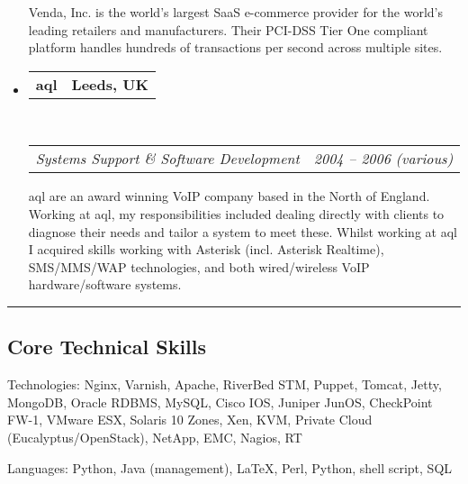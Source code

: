 \documentclass[10pt,a4paper]{article}
\makeatletter
\newenvironment{indentsection}[1]%
{\begin{list}{}%
	{\setlength{\leftmargin}{#1}}%
	\item[]%
}
{\end{list}}
\newcommand{\headerrow}[2]
{\begin{tabular*}{\linewidth}{l@{\extracolsep{\fill}}r}
	#1 &
	#2 \\
\end{tabular*}}
\makeatother
\begin{document}
\begin{itemize}
		Venda, Inc. is the world's largest SaaS e-commerce provider for the world's leading retailers and manufacturers. Their PCI-DSS Tier One compliant platform handles hundreds of transactions per second across multiple sites.


	\item
	\headerrow
		{\textbf{aql}}
		{\textbf{Leeds, UK}}
	\\
	\headerrow
		{\emph{Systems Support \& Software Development}}
		{\emph{2004 -- 2006 (various)}}

		aql are an award winning VoIP company based in the North of England. Working at aql, my responsibilities included dealing directly with clients to diagnose their needs and tailor a system to meet these. Whilst working at aql I acquired skills working with Asterisk (incl. Asterisk Realtime), SMS/MMS/WAP technologies, and both wired/wireless VoIP hardware/software systems.


\end{itemize}


\hrule
\vspace{-0.4em}
\subsection*{Core Technical Skills}

\begin{indentsection}{\parindent}
\begin{description*}
	\item[Technologies:]
	Nginx, Varnish, Apache, RiverBed STM, Puppet, Tomcat, Jetty, MongoDB, Oracle RDBMS, MySQL, Cisco IOS, Juniper JunOS, CheckPoint FW-1, VMware ESX, Solaris 10 Zones, Xen, KVM, Private Cloud (Eucalyptus/OpenStack), NetApp, EMC, Nagios, RT
	\item[Languages:]
	Python, Java (management), \LaTeX, Perl, Python, shell script, SQL
\end{description*}
\end{indentsection}
\end{document}
